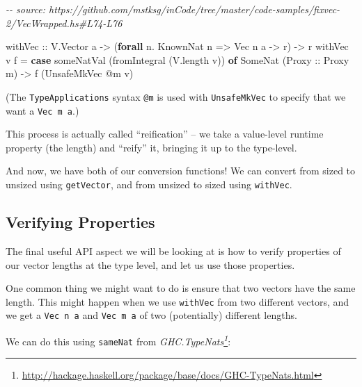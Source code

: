 \documentclass[]{article}
\newenvironment{Shaded}{}{}
\newcommand{\CommentTok}[1]{\textcolor[rgb]{0.38,0.63,0.69}{\textit{#1}}}
\newcommand{\DataTypeTok}[1]{\textcolor[rgb]{0.56,0.13,0.00}{#1}}
\newcommand{\FunctionTok}[1]{\textcolor[rgb]{0.02,0.16,0.49}{#1}}
\newcommand{\KeywordTok}[1]{\textcolor[rgb]{0.00,0.44,0.13}{\textbf{#1}}}
\newcommand{\NormalTok}[1]{#1}
\newcommand{\OperatorTok}[1]{\textcolor[rgb]{0.40,0.40,0.40}{#1}}
\newcommand{\OtherTok}[1]{\textcolor[rgb]{0.00,0.44,0.13}{#1}}
\renewcommand{\href}[2]{#2\footnote{\url{#1}}}
\begin{document}
\begin{Shaded}
\begin{Highlighting}[]
\CommentTok{{-}{-} source: https://github.com/mstksg/inCode/tree/master/code{-}samples/fixvec{-}2/VecWrapped.hs\#L74{-}L76}

\OtherTok{withVec ::} \DataTypeTok{V.Vector}\NormalTok{ a }\OtherTok{{-}>}\NormalTok{ (}\KeywordTok{forall}\NormalTok{ n}\OperatorTok{.} \DataTypeTok{KnownNat}\NormalTok{ n }\OtherTok{=>} \DataTypeTok{Vec}\NormalTok{ n a }\OtherTok{{-}>}\NormalTok{ r) }\OtherTok{{-}>}\NormalTok{ r}
\NormalTok{withVec v f }\OtherTok{=} \KeywordTok{case}\NormalTok{ someNatVal (}\FunctionTok{fromIntegral}\NormalTok{ (V.length v)) }\KeywordTok{of}
    \DataTypeTok{SomeNat}\NormalTok{ (}\DataTypeTok{Proxy}\OtherTok{ ::} \DataTypeTok{Proxy}\NormalTok{ m) }\OtherTok{{-}>}\NormalTok{ f (}\DataTypeTok{UnsafeMkVec} \OperatorTok{@}\NormalTok{m v)}
\end{Highlighting}
\end{Shaded}

(The \texttt{TypeApplications} syntax \texttt{@m} is used with
\texttt{UnsafeMkVec} to specify that we want a \texttt{Vec\ m\ a}.)

This process is actually called ``reification'' -- we take a value-level runtime
property (the length) and ``reify'' it, bringing it up to the type-level.

And now, we have both of our conversion functions! We can convert from sized to
unsized using \texttt{getVector}, and from unsized to sized using
\texttt{withVec}.

\hypertarget{verifying-properties}{%
\subsection{Verifying Properties}\label{verifying-properties}}

The final useful API aspect we will be looking at is how to verify properties of
our vector lengths at the type level, and let us use those properties.

One common thing we might want to do is ensure that two vectors have the same
length. This might happen when we use \texttt{withVec} from two different
vectors, and we get a \texttt{Vec\ n\ a} and \texttt{Vec\ m\ a} of two
(potentially) different lengths.

We can do this using \texttt{sameNat} from
\emph{\href{http://hackage.haskell.org/package/base/docs/GHC-TypeNats.html}{GHC.TypeNats}}:
\end{document}
